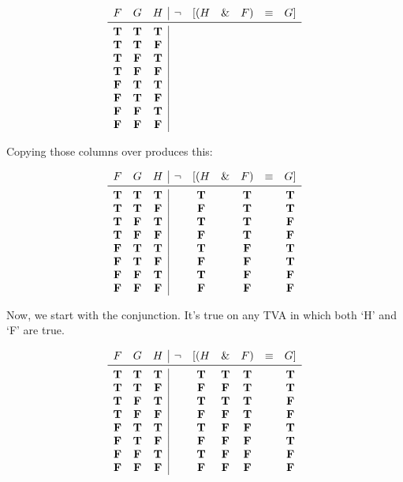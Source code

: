 \documentclass[../logic-text.tex]{subfiles}
\begin{document}
\[
  \begin{array}{ccc|cccccc}
    F & G & H & \lneg & [(H & \land & F) & \liff & G] \\ \midrule
    \true & \true & \true&&&&&&\\
    \true & \true & \false&&&&&&\\
    \true & \false & \true&&&&&&\\
    \true & \false & \false&&&&&&\\
    \false & \true & \true&&&&&&\\
    \false & \true & \false&&&&&&\\
    \false & \false & \true&&&&&&\\
    \false & \false & \false&&&&&&\\
  \end{array}
\]

Copying those columns over produces this:

\[
  \begin{array}{ccc|cccccc}
    F & G & H & \lneg & [(H & \land & F) & \liff & G] \\ \midrule
    \true & \true & \true && \true && \true && \true \\
    \true & \true & \false && \false && \true && \true \\
    \true & \false & \true && \true && \true && \false \\
    \true & \false & \false && \false && \true && \false \\
    \false & \true & \true && \true && \false && \true \\
    \false & \true & \false && \false&& \false && \true \\
    \false & \false & \true && \true && \false && \false \\
    \false & \false & \false && \false && \false && \false \\
  \end{array}
\]

Now, we start with the conjunction.
It's true on any TVA in which both \enquote*{H} and \enquote*{F} are true.

\[
  \begin{array}{ccc|cccccc}
    F & G & H & \lneg & [(H & \land & F) & \liff & G] \\ \midrule
    \true & \true & \true && \true & \true & \true && \true \\
    \true & \true & \false && \false & \false & \true && \true \\
    \true & \false & \true && \true & \true & \true && \false \\
    \true & \false & \false && \false & \false & \true && \false \\
    \false & \true & \true && \true & \false & \false && \true \\
    \false & \true & \false && \false& \false & \false && \true \\
    \false & \false & \true && \true & \false & \false && \false \\
    \false & \false & \false && \false & \false & \false && \false \\
  \end{array}
\]
\end{document}
